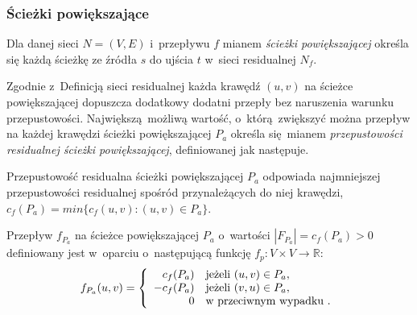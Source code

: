 \subsubsection{\textbf{Ścieżki powiększające}}
\par{
  \begin{definition}
    Dla danej sieci $N=(V,E)$ i~przepływu $f$ mianem \emph{ścieżki powiększającej} określa się każdą ścieżkę ze źródła $s$ do ujścia $t$ w~sieci residualnej $N_f$.
  \end{definition}
  Zgodnie z~Definicją sieci residualnej każda krawędź $(u, v)$ na ścieżce powiększającej dopuszcza dodatkowy dodatni przepły bez naruszenia warunku przepustowości.
  Największą możliwą wartość, o~którą zwiększyć można przepływ na każdej krawędzi ścieżki powiększającej $P_a$ określa się mianem \emph{przepustowości residualnej ścieżki powiększającej}, definiowanej jak następuje.
  \begin{definition}
    Przepustowość residualna ścieżki powiększającej $P_a$ odpowiada najmniejszej przepustowości residualnej spośród przynależących do niej krawędzi, $c_f(P_a) = min\{c_f(u, v):(u, v)\in P_a\}$.
  \end{definition}
  \begin{definition}
    Przepływ $f_{P_a}$ na ścieżce powiększającej $P_a$ o~wartości $|F_{P_a}| = c_f(P_a) > 0$ definiowany jest w~oparciu o~następującą funkcję $f_p: V \times V \rightarrow \mathbb{R}$: 
    \begin{equation*}
    f_{P_a}(u, v) = \left\{
    \begin{array}{rl}
    c_f(P_a) & \textnormal{jeżeli } (u, v) \in P_a,\\
    -c_f(P_a) & \textnormal{jeżeli } (v, u) \in P_a,\\
    0 & \textnormal{w przeciwnym wypadku }.
    \end{array} \right.
    \end{equation*}
  \end{definition}
}

